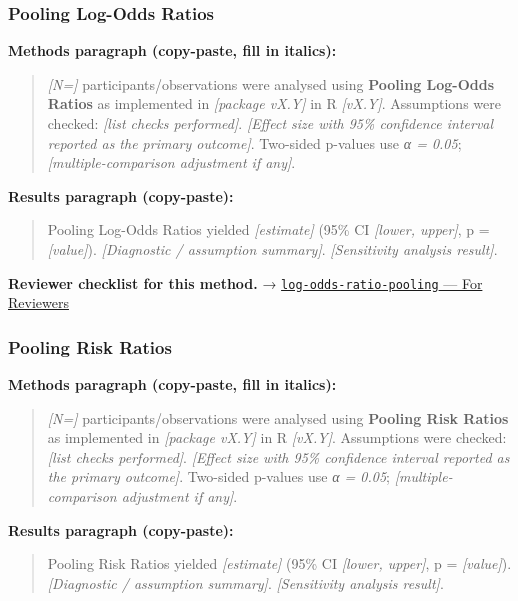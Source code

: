 \documentclass[
]{article}
\begin{document}
\subsubsection{Pooling Log-Odds Ratios}\label{pooling-log-odds-ratios}

\textbf{Methods paragraph (copy-paste, fill in italics):}

\begin{quote}
\emph{{[}N={]}} participants/observations were analysed using
\textbf{Pooling Log-Odds Ratios} as implemented in \emph{{[}package
vX.Y{]}} in R \emph{{[}vX.Y{]}}. Assumptions were checked: \emph{{[}list
checks performed{]}}. \emph{{[}Effect size with 95\% confidence interval
reported as the primary outcome{]}}. Two-sided p-values use \emph{α =
0.05}; \emph{{[}multiple-comparison adjustment if any{]}}.
\end{quote}

\textbf{Results paragraph (copy-paste):}

\begin{quote}
Pooling Log-Odds Ratios yielded \emph{{[}estimate{]}} (95\% CI
\emph{{[}lower, upper{]}}, p = \emph{{[}value{]}}). \emph{{[}Diagnostic
/ assumption summary{]}}. \emph{{[}Sensitivity analysis result{]}}.
\end{quote}

\textbf{Reviewer checklist for this method.} →
\href{../chapters/15-metaanalysis/log-odds-ratio-pooling.Rmd\#for-reviewers}{\texttt{log-odds-ratio-pooling}
--- For Reviewers}

\subsubsection{Pooling Risk Ratios}\label{pooling-risk-ratios}

\textbf{Methods paragraph (copy-paste, fill in italics):}

\begin{quote}
\emph{{[}N={]}} participants/observations were analysed using
\textbf{Pooling Risk Ratios} as implemented in \emph{{[}package vX.Y{]}}
in R \emph{{[}vX.Y{]}}. Assumptions were checked: \emph{{[}list checks
performed{]}}. \emph{{[}Effect size with 95\% confidence interval
reported as the primary outcome{]}}. Two-sided p-values use \emph{α =
0.05}; \emph{{[}multiple-comparison adjustment if any{]}}.
\end{quote}

\textbf{Results paragraph (copy-paste):}

\begin{quote}
Pooling Risk Ratios yielded \emph{{[}estimate{]}} (95\% CI
\emph{{[}lower, upper{]}}, p = \emph{{[}value{]}}). \emph{{[}Diagnostic
/ assumption summary{]}}. \emph{{[}Sensitivity analysis result{]}}.
\end{quote}
\end{document}
